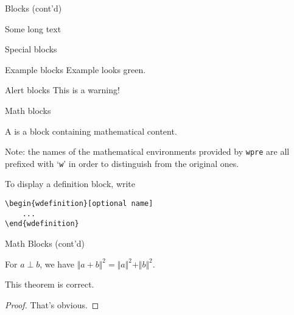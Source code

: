 \documentclass[no-math, aspectratio=1610, 10pt]{beamer}
\begin{document}
    \begin{frame}{Blocks (cont'd)}
        \begin{block}{Some long text}
            \lipsum[3]
        \end{block}
    \end{frame}

    \begin{frame}{Special blocks}
        \begin{exampleblock}{Example blocks}
            Example looks green.
        \end{exampleblock}

        \begin{alertblock}{Alert blocks}
            This is a warning!
        \end{alertblock}
    \end{frame}

    \begin{frame}[fragile]{Math blocks}
        \begin{wdefinition}
            A  is a block containing mathematical content.
        \end{wdefinition}

        \alert{Note:} the names of the mathematical environments provided by \texttt{wpre} are all prefixed with `\texttt{w}' in order to distinguish from the original ones.

        \begin{wexample}
            To display a definition block, write
            \begin{verbatim}
\begin{wdefinition}[optional name]
    ...
\end{wdefinition}\end{verbatim}
        \end{wexample}
    \end{frame}

    \begin{frame}{Math Blocks (cont'd)}
        \begin{wlemma}
            For $a\perp b$, we have $\Vert a + b\Vert^2 = \Vert a\Vert^2 + \Vert b\Vert^2$.
        \end{wlemma}

        \begin{wtheorem}
            This theorem is correct.
        \end{wtheorem}

        \begin{proof}
            That's obvious.
        \end{proof}
    \end{frame}
\end{document}
